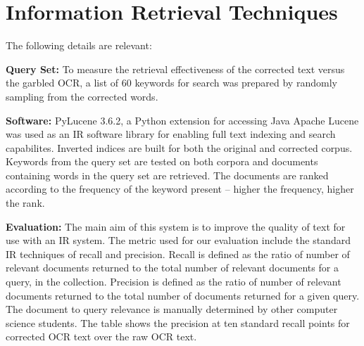 \documentclass[letterpaper]{article}
\begin{document}
\section{Information Retrieval Techniques}
\label{ir}
The following details are relevant: 

\noindent \textbf{Query Set:} To measure the retrieval effectiveness of the corrected text versus the garbled OCR, a list of 60 keywords for search was prepared by randomly sampling from the corrected words.

\noindent \textbf{Software:} PyLucene 3.6.2, a Python extension for accessing Java Apache Lucene was used as an IR software library for enabling full text indexing and search capabilites. Inverted indices are built for both the original and corrected corpus. Keywords from the query set are tested on both corpora and documents containing words in the query set are retrieved. The documents are ranked according to the frequency of the keyword present -- higher the frequency, higher the rank.
 
\noindent \textbf{Evaluation:} The main aim of this system is to improve the quality of text for use with an IR system. The metric used for our evaluation include the standard IR techniques of recall and precision. Recall is defined as the ratio of number of relevant documents returned to the total number of relevant documents for a query, in the collection. Precision is defined as the ratio of number of relevant documents returned to the total number of documents returned for a given query. The document to query relevance is manually determined by other computer science students. The table shows the precision at ten standard recall points for corrected OCR text over the raw OCR text.  


\end{document}

